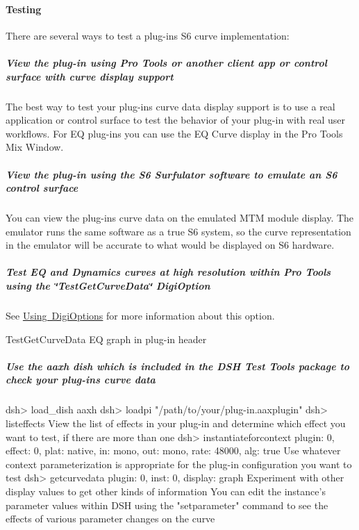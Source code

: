 \paragraph*{Testing}

 There are several ways to test a plug-\/in\textquotesingle{}s S6 curve implementation\+:

 \subparagraph*{View the plug-\/in using Pro Tools or another client app or control surface with curve display support }

  The best way to test your plug-\/in\textquotesingle{}s curve data display support is to use a real application or control surface to test the behavior of your plug-\/in with real user workflows. For EQ plug-\/ins you can use the EQ Curve display in the Pro Tools Mix Window.

 

 \subparagraph*{View the plug-\/in using the S6 Surfulator software to emulate an S6 control surface }

  You can view the plug-\/in\textquotesingle{}s curve data on the emulated M\+TM module display. The emulator runs the same software as a true S6 system, so the curve representation in the emulator will be accurate to what would be displayed on S6 hardware. 

 \subparagraph*{Test EQ and Dynamics curves at high resolution within Pro Tools using the \char`\"{}\+Test\+Get\+Curve\+Data\char`\"{} Digi\+Option }

  See \mbox{\hyperlink{a00830_aax_pro_tools_guide_06c_digioptions}{Using Digi\+Options}} for more information about this option.

  Test\+Get\+Curve\+Data EQ graph in plug-\/in header 

 \subparagraph*{Use the aaxh dish which is included in the D\+SH Test Tools package to check your plug-\/in\textquotesingle{}s curve data }

  \begin{DoxyVerb}dsh> load_dish aaxh
dsh> loadpi "/path/to/your/plug-in.aaxplugin"
dsh> listeffects
	View the list of effects in your plug-in and determine which effect you want to test, if there are more than one
dsh> instantiateforcontext {plugin: 0, effect: 0, plat: native, in: mono, out: mono, rate: 48000, alg: true}
	Use whatever context parameterization is appropriate for the plug-in configuration you want to test
dsh> getcurvedata {plugin: 0, inst: 0, display: graph}
	Experiment with other display values to get other kinds of information
	You can edit the instance's parameter values within DSH using the "setparameter" command to see the effects of various parameter changes on the curve\end{DoxyVerb}


